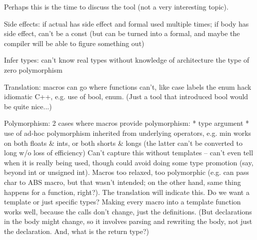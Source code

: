 \documentclass{slides}
\begin{document}
\begin{note}
\small
Perhaps this is the time to discuss the tool (not a very interesting
topic).

Side effects: if actual has side effect and formal used multiple times; if
body has side effect, can't be a const (but can be turned into a formal, and
maybe the compiler will be able to figure something out)

Infer types:
 can't know real types without knowledge of architecture
 the type of zero
 polymorphism

Translation:
 macros can go where functions can't, like case labels
 the enum hack
 idiomatic C++, e.g. use of bool, enum.  (Just a tool that introduced bool
     would be quite nice...)

Polymorphism:
2 cases where macros provide polymorphism:
 * type argument
 * use of ad-hoc polymorphism inherited from underlying operators, e.g.
     min works on both floats \& ints, or both shorts \& longs (the latter
     can't be converted to long w/o loss of efficiency)
Can't capture this without templates -- can't even tell when it is
really being used, though could avoid doing some type promotion (say,
beyond int or unsigned int).
Macros too relaxed, too polymorphic (e.g. can pass char to ABS macro, but
that wasn't intended; on the other hand, same thing happens for a function,
right?).  The translation will indicate this.  Do we want a
template or just specific types?
Making every macro into a template function works well, because the calls
don't change, just the definitions.  (But declarations in the body might
change, so it involves parsing and rewriting the body, not just the
declaration.  And, what is the return type?)
\end{note}
\end{document}
